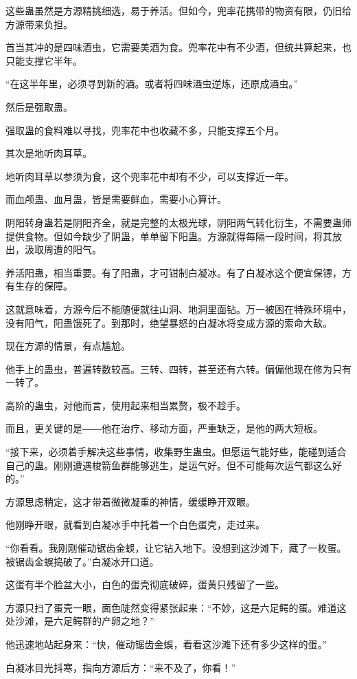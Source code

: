 \begin{this_body}
这些蛊虽然是方源精挑细选，易于养活。但如今，兜率花携带的物资有限，仍旧给方源带来负担。

首当其冲的是四味酒虫，它需要美酒为食。兜率花中有不少酒，但统共算起来，也只能支撑它半年。

“在这半年里，必须寻到新的酒。或者将四味酒虫逆炼，还原成酒虫。”

然后是强取蛊。

强取蛊的食料难以寻找，兜率花中也收藏不多，只能支撑五个月。

其次是地听肉耳草。

地听肉耳草以参须为食，这个兜率花中却有不少，可以支撑近一年。

而血颅蛊、血月蛊，皆是需要鲜血，需要小心算计。

阴阳转身蛊若是阴阳齐全，就是完整的太极光球，阴阳两气转化衍生，不需要蛊师提供食物。但如今缺少了阴蛊，单单留下阳蛊。方源就得每隔一段时间，将其放出，汲取周遭的阳气。

养活阳蛊，相当重要。有了阳蛊，才可钳制白凝冰。有了白凝冰这个便宜保镖，方有生存的保障。

这就意味着，方源今后不能随便就往山洞、地洞里面钻。万一被困在特殊环境中，没有阳气，阳蛊饿死了。到那时，绝望暴怒的白凝冰将变成方源的索命大敌。

现在方源的情景，有点尴尬。

他手上的蛊虫，普遍转数较高。三转、四转，甚至还有六转。偏偏他现在修为只有一转了。

高阶的蛊虫，对他而言，使用起来相当累赘，极不趁手。

而且，更关键的是――他在治疗、移动方面，严重缺乏，是他的两大短板。

“接下来，必须着手解决这些事情，收集野生蛊虫。但愿运气能好些，能碰到适合自己的蛊。刚刚遭遇梭箭鱼群能够逃生，是运气好。但不可能每次运气都这么好的。”

方源思虑稍定，这才带着微微凝重的神情，缓缓睁开双眼。

他刚睁开眼，就看到白凝冰手中托着一个白色蛋壳，走过来。

“你看看。我刚刚催动锯齿金蜈，让它钻入地下。没想到这沙滩下，藏了一枚蛋。被锯齿金蜈捣破了。”白凝冰开口道。

这蛋有半个脸盆大小，白色的蛋壳彻底破碎，蛋黄只残留了一些。

方源只扫了蛋壳一眼，面色陡然变得紧张起来：“不妙，这是六足鳄的蛋。难道这处沙滩，是六足鳄群的产卵之地？”

他迅速地站起身来：“快，催动锯齿金蜈，看看这沙滩下还有多少这样的蛋。”

白凝冰目光抖寒，指向方源后方：“来不及了，你看！”


\end{this_body}
